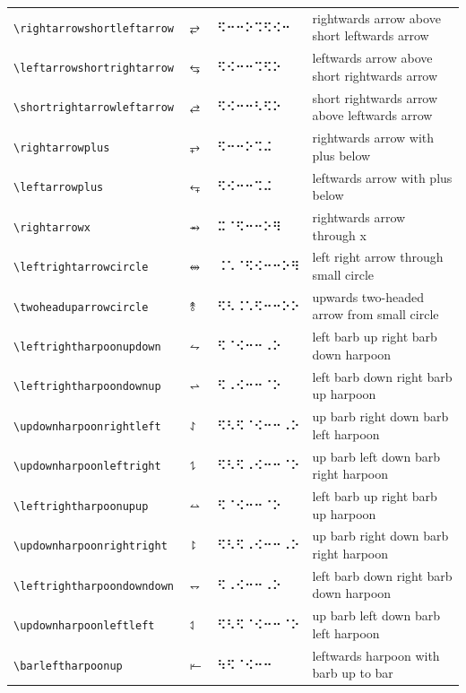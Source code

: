 \documentclass[oneside]{article}
\begin{document}
\begin{longtable}{llll}
\verb|\rightarrowshortleftarrow| & $\rightarrowshortleftarrow$ &   ⠫⠒⠒⠕⠩⠫⠪⠒   & {rightwards arrow above short leftwards arrow} \\[2ex]
\verb|\leftarrowshortrightarrow| & $\leftarrowshortrightarrow$ &   ⠫⠪⠒⠒⠩⠫⠕   & {leftwards arrow above short rightwards arrow} \\[2ex]
\verb|\shortrightarrowleftarrow| & $\shortrightarrowleftarrow$ &   ⠫⠪⠒⠒⠣⠫⠕   & {short rightwards arrow above leftwards arrow} \\[2ex]
\verb|\rightarrowplus| & $\rightarrowplus$ &   ⠫⠒⠒⠕⠩⠬   & {rightwards arrow with plus below} \\[2ex]
\verb|\leftarrowplus| & $\leftarrowplus$ &   ⠫⠪⠒⠒⠩⠬   & {leftwards arrow with plus below} \\[2ex]
\verb|\rightarrowx| & $\rightarrowx$ &   ⠭⠈⠫⠒⠒⠕⠻   & {rightwards arrow through x} \\[2ex]
\verb|\leftrightarrowcircle| & $\leftrightarrowcircle$ &   ⠨⠡⠈⠫⠪⠒⠒⠕⠻   & {left right arrow through small circle} \\[2ex]
\verb|\twoheaduparrowcircle| & $\twoheaduparrowcircle$ &   ⠫⠣⠨⠡⠫⠒⠒⠕⠕   & {upwards two-headed arrow from small circle} \\[2ex]
\verb|\leftrightharpoonupdown| & $\leftrightharpoonupdown$ &   ⠫⠈⠪⠒⠒⠠⠕   & {left barb up right barb down harpoon} \\[2ex]
\verb|\leftrightharpoondownup| & $\leftrightharpoondownup$ &   ⠫⠠⠪⠒⠒⠈⠕   & {left barb down right barb up harpoon} \\[2ex]
\verb|\updownharpoonrightleft| & $\updownharpoonrightleft$ &   ⠫⠣⠫⠈⠪⠒⠒⠠⠕   & {up barb right down barb left harpoon} \\[2ex]
\verb|\updownharpoonleftright| & $\updownharpoonleftright$ &   ⠫⠣⠫⠠⠪⠒⠒⠈⠕   & {up barb left down barb right harpoon} \\[2ex]
\verb|\leftrightharpoonupup| & $\leftrightharpoonupup$ &   ⠫⠈⠪⠒⠒⠈⠕   & {left barb up right barb up harpoon} \\[2ex]
\verb|\updownharpoonrightright| & $\updownharpoonrightright$ &   ⠫⠣⠫⠠⠪⠒⠒⠠⠕   & {up barb right down barb right harpoon} \\[2ex]
\verb|\leftrightharpoondowndown| & $\leftrightharpoondowndown$ &   ⠫⠠⠪⠒⠒⠠⠕   & {left barb down right barb down harpoon} \\[2ex]
\verb|\updownharpoonleftleft| & $\updownharpoonleftleft$ &   ⠫⠣⠫⠈⠪⠒⠒⠈⠕   & {up barb left down barb left harpoon} \\[2ex]
\verb|\barleftharpoonup| & $\barleftharpoonup$ &   ⠳⠫⠈⠪⠒⠒   & {leftwards harpoon with barb up to bar} \\[2ex]

\end{longtable}
\end{document}
